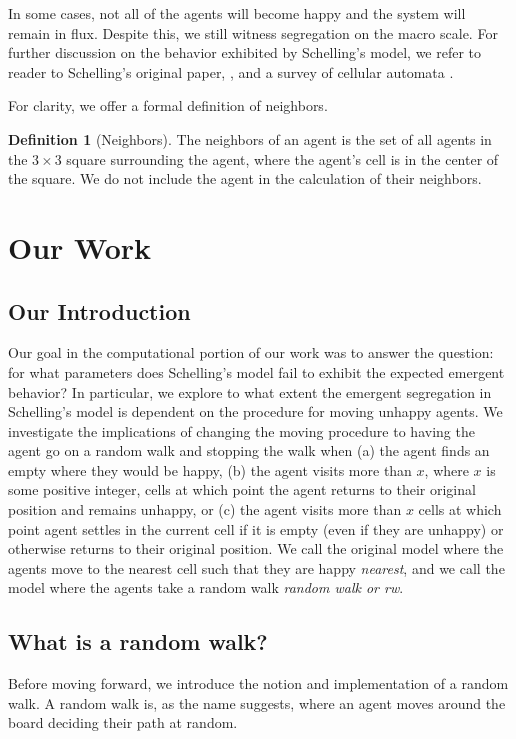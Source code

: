 \documentclass[11pt,twoside]{amsart}
\theoremstyle{theorem}
\theoremstyle{definition}
\newtheorem{definition}[theorem]{Definition}
\theoremstyle{remark}
\begin{document}
In some cases, not all of the agents will become happy and the system will remain in flux. 
Despite this, we still witness segregation on the macro scale. 
For further discussion on the behavior exhibited by Schelling's model, we refer to reader to Schelling's original paper, \cite{schelling}, and a survey of cellular automata \cite{thesis}.

For clarity, we offer a formal definition of neighbors.
\begin{definition}[Neighbors]
    The neighbors of an agent is the set of all agents in the $3 \times 3$ square surrounding the agent, where the agent's cell is in the center of the square. 
    We do not include the agent in the calculation of their neighbors. 
\end{definition}

\section{Our Work}
\subsection{Our Introduction}
Our goal in the computational portion of our work was to answer the question: for what parameters does Schelling's model fail to exhibit the expected emergent behavior?
In particular, we explore to what extent the emergent segregation in Schelling's model is dependent on the procedure for moving unhappy agents.
We investigate the implications of changing the moving procedure to having the agent go on a random walk and stopping the walk when (a) the agent finds an empty where they would be happy, (b) the agent visits more than $x$, where $x$ is some positive integer, cells at which point the agent returns to their original position and remains unhappy, or (c) the agent visits more than $x$ cells at which point agent settles in the current cell if it is empty (even if they are unhappy) or otherwise returns to their original position.
We call the original model where the agents move to the nearest cell such that they are happy \emph{nearest}, and we call the model where the agents take a random walk \emph{random walk or rw}.

\subsection{What is a random walk?}
Before moving forward, we introduce the notion and implementation of a random walk.
A random walk is, as the name suggests, where an agent moves around the board deciding their path at random. 
\end{document}
